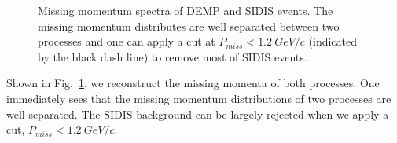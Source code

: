 \begin{figure}[!ht]
 \begin{center}
   \caption[Missing Momentum]{\footnotesize{Missing momentum spectra of DEMP and SIDIS events. The missing momentum distributes are well separated between two processes and one can apply a cut at $P_{miss}<1.2~GeV/c$ (indicated by the black dash line) to remove most of SIDIS events.}}
  \label{missing_mom}
  \end{center}
\end{figure}
Shown in Fig.~\ref{missing_mom}, we reconstruct the missing momenta of both processes. One immediately sees that the missing momentum distributions of two processes are well separated. The SIDIS background can be largely rejected when we apply a cut, $P_{miss}<1.2~GeV/c$. 

